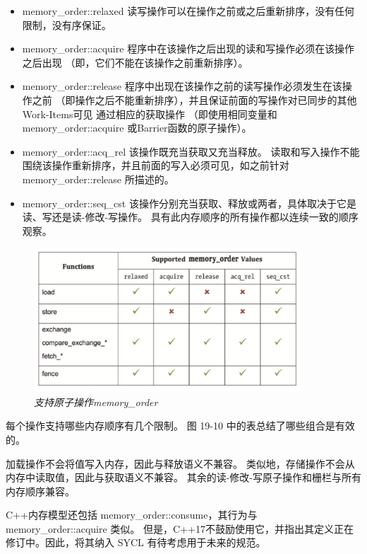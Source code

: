 \begin{itemize}
	\item memory\_order::relaxed 读写操作可以在操作之前或之后重新排序，没有任何限制，没有序保证。

	\item memory\_order::acquire 程序中在该操作之后出现的读和写操作必须在该操作之后出现
	（即，它们不能在该操作之前重新排序）。

	\item memory\_order::release 程序中出现在该操作之前的读写操作必须发生在该操作之前
	（即操作之后不能重新排序），并且保证前面的写操作对已同步的其他Work-Items可见 通过相应的获取操作
	（即使用相同变量和 memory\_order::acquire 或Barrier函数的原子操作）。

	\item memory\_order::acq\_rel 该操作既充当获取又充当释放。 
	读取和写入操作不能围绕该操作重新排序，并且前面的写入必须可见，如之前针对 memory\_order::release 所描述的。

	\item memory\_order::seq\_cst 该操作分别充当获取、释放或两者，具体取决于它是读、写还是读-修改-写操作。 
	具有此内存顺序的所有操作都以连续一致的顺序观察。
\end{itemize}

\begin{figure}[H]
	\centering
	\includegraphics[width=0.9\textwidth]{figs/F19.10.png}
	\caption{\textit{支持原子操作memory\_order }}
\end{figure}

每个操作支持哪些内存顺序有几个限制。 图 19-10 中的表总结了哪些组合是有效的。

加载操作不会将值写入内存，因此与释放语义不兼容。 类似地，存储操作不会从内存中读取值，因此与获取语义不兼容。 
其余的读-修改-写原子操作和栅栏与所有内存顺序兼容。

\begin{remark}[C++ 中的内存序]
	C++内存模型还包括 memory\_order::consume，其行为与 memory\_order::acquire 类似。
	但是，C++17不鼓励使用它，并指出其定义正在修订中。因此，将其纳入 SYCL 有待考虑用于未来的规范。
\end{remark}

